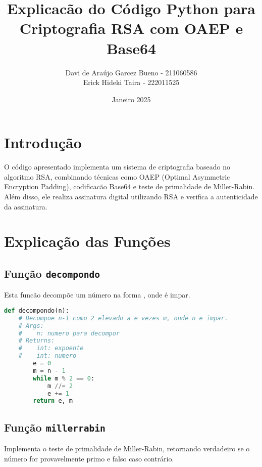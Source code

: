 \documentclass{article}
\title{Explicacão do Código Python para Criptografia RSA com OAEP e Base64}
\author{Davi de Araújo Garcez Bueno - 211060586 \\ Erick Hideki Taira - 222011525}
\date{Janeiro 2025}
\begin{document}
\maketitle

\section{Introdução}
O código apresentado implementa um sistema de criptografia baseado no algoritmo RSA, combinando técnicas como OAEP (Optimal Asymmetric Encryption Padding), codificacão Base64 e teste de primalidade de Miller-Rabin. Além disso, ele realiza assinatura digital utilizando RSA e verifica a autenticidade da assinatura.

\section{Explicação das Funções}

\subsection{Função \texttt{decompondo}}
Esta funcão decompõe um número  na forma , onde  é impar.

\begin{lstlisting}[language=Python]
def decompondo(n):
    # Decompoe n-1 como 2 elevado a e vezes m, onde n e impar.
    # Args:
    #    n: numero para decompor
    # Returns:
    #    int: expoente
    #    int: numero
        e = 0
        m = n - 1
        while m % 2 == 0:
            m //= 2        
            e += 1
        return e, m
\end{lstlisting}

\subsection{Função \texttt{miller\textunderscore rabin}}
Implementa o teste de primalidade de Miller-Rabin, retornando verdadeiro se o número for provavelmente primo e falso caso contrário.
\end{document}

